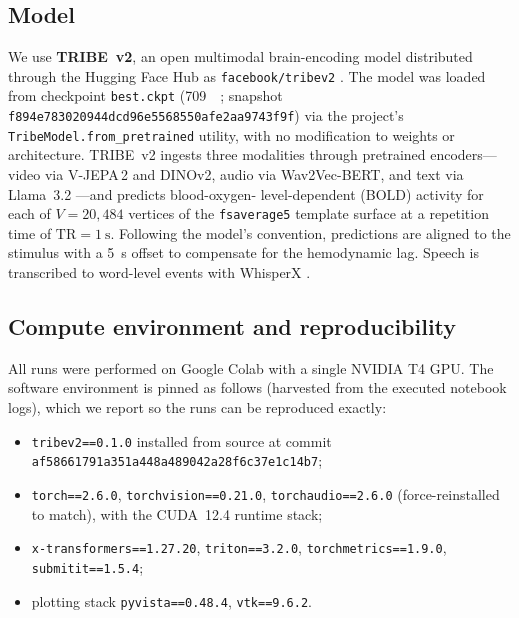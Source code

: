\documentclass[11pt]{article}
\begin{document}
\subsection{Model}
We use \textbf{TRIBE~v2}, an open multimodal brain-encoding model distributed
through the Hugging Face Hub as \texttt{facebook/tribev2}
\citep{tribe2025}. The model was loaded from checkpoint \texttt{best.ckpt}
(\SI{709}{\mega\byte}; snapshot
\texttt{f894e783020944dcd96e5568550afe2aa9743f9f}) via the project's
\texttt{TribeModel.from\_pretrained} utility, with no modification to weights or
architecture. TRIBE~v2 ingests three modalities through pretrained encoders---
video via V-JEPA\,2 and DINOv2, audio via Wav2Vec-BERT, and text via
Llama~3.2 \citep{vjepa2,dinov2,wav2vecbert,llama3}---and predicts blood-oxygen-
level-dependent (BOLD) activity for each of $V=20{,}484$ vertices of the
\texttt{fsaverage5} template surface \citep{fischl2012} at a repetition time of
$\mathrm{TR}=\SI{1}{\second}$. Following the model's convention, predictions are
aligned to the stimulus with a \SI{5}{\second} offset to compensate for the
hemodynamic lag. Speech is transcribed to word-level events with WhisperX
\citep{whisperx,radford2023}.

\subsection{Compute environment and reproducibility}
\label{sec:repro}
All runs were performed on Google Colab with a single NVIDIA T4 GPU. The
software environment is pinned as follows (harvested from the executed notebook
logs), which we report so the runs can be reproduced exactly:

\begin{itemize}[leftmargin=1.4em,itemsep=0.1em,topsep=0.2em]
  \item \texttt{tribev2==0.1.0} installed from source at commit\\
        {\footnotesize\texttt{af58661791a351a448a489042a28f6c37e1c14b7}};
  \item \texttt{torch==2.6.0}, \texttt{torchvision==0.21.0},
        \texttt{torchaudio==2.6.0} (force-reinstalled to match), with the
        CUDA~12.4 runtime stack;
  \item \texttt{x-transformers==1.27.20}, \texttt{triton==3.2.0},
        \texttt{torchmetrics==1.9.0}, \texttt{submitit==1.5.4};
  \item plotting stack \texttt{pyvista==0.48.4}, \texttt{vtk==9.6.2}.
\end{itemize}
\end{document}
